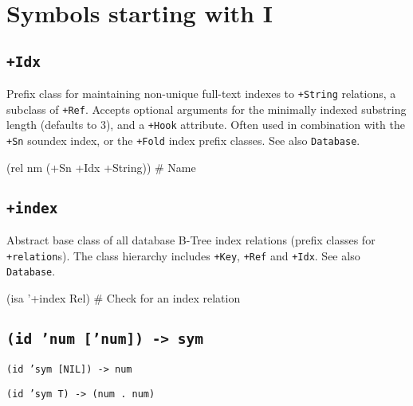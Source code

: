 %
%
%


\chapter{Symbols starting with I}
\label{cha:func-ref-I-functions-starting-with-I}

 
\section*{\texttt{+Idx}}
\label{sec:func-ref-I-+Idx}

Prefix class for maintaining non-unique full-text indexes to \texttt{+String}
relations, a subclass of \texttt{+Ref}. Accepts optional arguments for the
minimally indexed substring length (defaults to 3), and a \texttt{+Hook}
attribute. Often used in combination with the \texttt{+Sn} soundex index, or
the \texttt{+Fold} index prefix classes. See also \texttt{Database}.


\begin{wideverbatim}
(rel nm (+Sn +Idx +String))  # Name
\end{wideverbatim}

 
\section*{\texttt{+index}}
\label{sec:func-ref-I-+index}


Abstract base class of all database B-Tree index relations (prefix
classes for \texttt{+relation}s). The class hierarchy includes
\texttt{+Key}, \texttt{+Ref} and \texttt{+Idx}. See also
\texttt{Database}.


\begin{wideverbatim}
(isa '+index Rel)  # Check for an index relation
\end{wideverbatim}

 
\section*{\texttt{(id 'num ['num]) -> sym}}
\label{sec:func-ref-I-(id 'num ['num]) -> sym}


\texttt{(id 'sym [NIL]) -> num}

\texttt{(id 'sym T) -> (num . num)}

